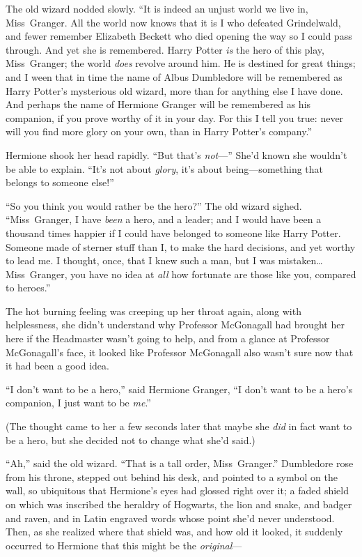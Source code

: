 The old wizard nodded slowly.
“It is indeed an unjust world we live in, Miss~Granger. All the world now knows that it is I who defeated Grindelwald, and fewer remember Elizabeth Beckett who died opening the way so I could pass through. And yet she is remembered. Harry Potter \emph{is} the hero of this play, Miss~Granger; the world \emph{does} revolve around him. He is destined for great things; and I ween that in time the name of Albus Dumbledore will be remembered as Harry Potter’s mysterious old wizard, more than for anything else I have done. And perhaps the name of Hermione Granger will be remembered as his companion, if you prove worthy of it in your day. For this I tell you true: never will you find more glory on your own, than in Harry Potter’s company.”

Hermione shook her head rapidly.
“But that’s \emph{not}—” She’d known she wouldn’t be able to explain.
“It’s not about \emph{glory}, it’s about being—something that belongs to someone else!”

“So you think you would rather be the hero?” The old wizard sighed.
“Miss~Granger, I have \emph{been} a hero, and a leader; and I would have been a thousand times happier if I could have belonged to someone like Harry Potter. Someone made of sterner stuff than I, to make the hard decisions, and yet worthy to lead me. I thought, once, that I knew such a man, but I was mistaken…Miss~Granger, you have no idea at \emph{all} how fortunate are those like you, compared to heroes.”

The hot burning feeling was creeping up her throat again, along with helplessness, she didn’t understand why Professor McGonagall had brought her here if the Headmaster wasn’t going to help, and from a glance at Professor McGonagall’s face, it looked like Professor McGonagall also wasn’t sure now that it had been a good idea.

“I don’t want to be a hero,” said Hermione Granger,
“I don’t want to be a hero’s companion, I just want to be \emph{me}.”

(The thought came to her a few seconds later that maybe she \emph{did} in fact want to be a hero, but she decided not to change what she’d said.)

“Ah,” said the old wizard.
“That is a tall order, Miss~Granger.” Dumbledore rose from his throne, stepped out behind his desk, and pointed to a symbol on the wall, so ubiquitous that Hermione’s eyes had glossed right over it; a faded shield on which was inscribed the heraldry of Hogwarts, the lion and snake, and badger and raven, and in Latin engraved words whose point she’d never understood. Then, as she realized where that shield was, and how old it looked, it suddenly occurred to Hermione that this might be the \emph{original}—

